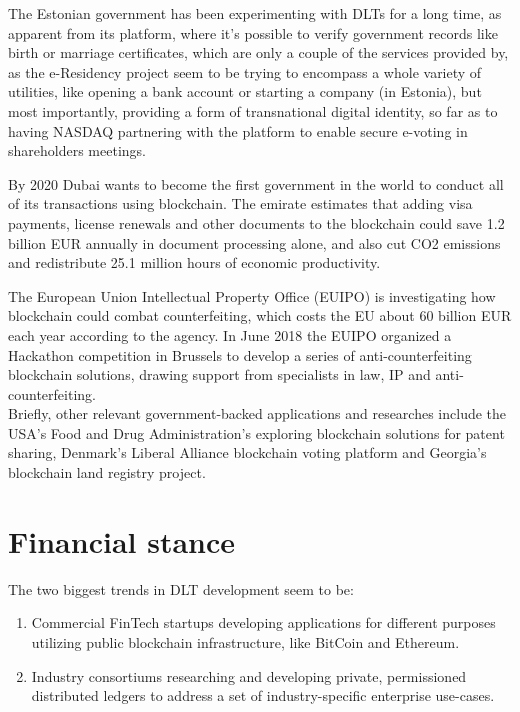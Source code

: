 The Estonian government has been experimenting with DLTs for a long time, as apparent from its \cite{eresidency} platform, where it's possible to verify government records like birth or marriage certificates, which are only a couple of the services provided by, as the e-Residency project seem to be trying to encompass a whole variety of utilities, like opening a bank account or starting a company (in Estonia), but most importantly, providing a form of transnational digital identity, so far as to having NASDAQ partnering with the platform to enable secure e-voting in shareholders meetings.

By 2020 Dubai wants to become the first government in the world to conduct all of its transactions using blockchain. The emirate estimates that adding visa payments, license renewals and other documents to the blockchain could save 1.2 billion EUR annually in document processing alone, and also cut CO2 emissions and redistribute 25.1 million hours of economic productivity.

The European Union Intellectual Property Office (EUIPO) is investigating how blockchain could combat counterfeiting, which costs the EU about 60 billion EUR each year according to the agency. In June 2018 the EUIPO organized a Hackathon competition in Brussels to develop a series of anti-counterfeiting blockchain solutions, drawing support from specialists in law, IP and anti-counterfeiting. \\

Briefly, other relevant government-backed applications and researches include the USA's Food and Drug Administration's exploring blockchain solutions for patent sharing, Denmark's Liberal Alliance blockchain voting platform and Georgia's blockchain land registry project. 


\section{Financial stance}

The two biggest trends in DLT development seem to be:
\begin{enumerate}
    \item Commercial FinTech startups developing applications for different purposes utilizing public blockchain infrastructure, like BitCoin and Ethereum.
    \item Industry consortiums researching and developing private, permissioned distributed ledgers to address a set of industry-specific enterprise use-cases.
\end{enumerate}

